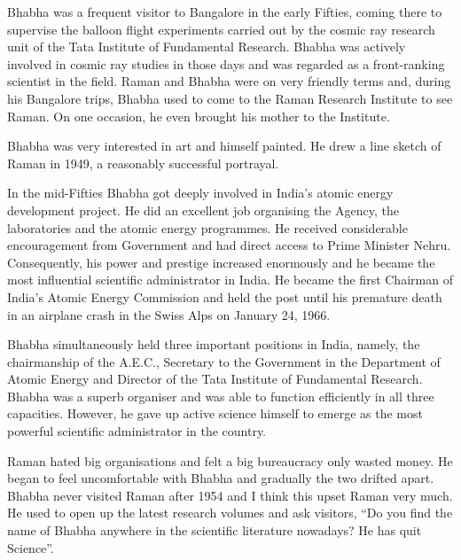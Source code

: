 Bhabha was a frequent visitor to Bangalore in the early
Fifties, coming there to supervise the balloon flight experiments
carried out by the cosmic ray research unit of the Tata Institute
of Fundamental Research. Bhabha was actively involved in cosmic
ray studies in those days and was regarded as a front-ranking
scientist in the field. Raman and Bhabha were on very friendly
terms and, during his Bangalore trips, Bhabha used to come to
the Raman Research Institute to see Raman. On one occasion,
he even brought his mother to the Institute.

Bhabha was very interested in art and himself painted.
He drew a line sketch of Raman in 1949, a reasonably successful
portrayal.

In the mid-Fifties Bhabha got deeply involved in India's
atomic energy development project. He did an excellent job
organising the Agency, the laboratories and the atomic energy
programmes. He received considerable encouragement from
Government and had direct access to Prime Minister Nehru.
Consequently, his power and prestige increased enormously and
he became the most influential scientific administrator in India.
He became the first Chairman of India's Atomic Energy
Commission and held the post until his premature death in an
airplane crash in the Swiss Alps on January 24, 1966.

Bhabha simultaneously held three important positions in
India, namely, the chairmanship of the A.E.C., Secretary to the
Government in the Department of Atomic Energy and Director
of the Tata Institute of Fundamental Research. Bhabha was a
superb organiser and was able to function efficiently in all three
capacities. However, he gave up active science himself to emerge
as the most powerful scientific administrator in the country.

Raman hated big organisations and felt a big bureaucracy
only wasted money. He began to feel uncomfortable with Bha\-bha
and gradually the two drifted apart. Bha\-bha never visited Raman
after 1954 and I think this upset Raman very much. He used to
open up the latest research volumes and ask visitors, ``Do you
find the name of Bhabha anywhere in the scientific literature
nowadays? He has quit Science''.

\medskip
{}
\smallskip

